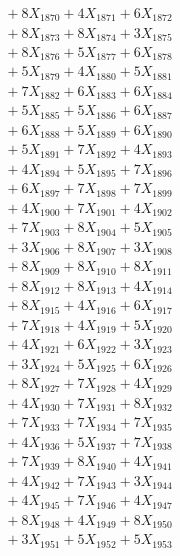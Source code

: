 \documentclass[a4paper,10pt]{article}
\begin{document}
{\begin{align}
&\;  + 8 X_{1870} + 4 X_{1871} + 6 X_{1872} \\[0.3ex]
&\;  + 8 X_{1873} + 8 X_{1874} + 3 X_{1875} \\[0.3ex]
&\;  + 8 X_{1876} + 5 X_{1877} + 6 X_{1878} \\[0.3ex]
&\;  + 5 X_{1879} + 4 X_{1880} + 5 X_{1881} \\[0.3ex]
&\;  + 7 X_{1882} + 6 X_{1883} + 6 X_{1884} \\[0.3ex]
&\;  + 5 X_{1885} + 5 X_{1886} + 6 X_{1887} \\[0.3ex]
&\;  + 6 X_{1888} + 5 X_{1889} + 6 X_{1890} \\[0.3ex]
&\;  + 5 X_{1891} + 7 X_{1892} + 4 X_{1893} \\[0.3ex]
&\;  + 4 X_{1894} + 5 X_{1895} + 7 X_{1896} \\[0.3ex]
&\;  + 6 X_{1897} + 7 X_{1898} + 7 X_{1899} \\[0.5ex]\allowbreak
&\;  + 4 X_{1900} + 7 X_{1901} + 4 X_{1902} \\[0.3ex]
&\;  + 7 X_{1903} + 8 X_{1904} + 5 X_{1905} \\[0.3ex]
&\;  + 3 X_{1906} + 8 X_{1907} + 3 X_{1908} \\[0.3ex]
&\;  + 8 X_{1909} + 8 X_{1910} + 8 X_{1911} \\[0.3ex]
&\;  + 8 X_{1912} + 8 X_{1913} + 4 X_{1914} \\[0.3ex]
&\;  + 8 X_{1915} + 4 X_{1916} + 6 X_{1917} \\[0.3ex]
&\;  + 7 X_{1918} + 4 X_{1919} + 5 X_{1920} \\[0.3ex]
&\;  + 4 X_{1921} + 6 X_{1922} + 3 X_{1923} \\[0.3ex]
&\;  + 3 X_{1924} + 5 X_{1925} + 6 X_{1926} \\[0.3ex]
&\;  + 8 X_{1927} + 7 X_{1928} + 4 X_{1929} \\[0.5ex]\allowbreak
&\;  + 4 X_{1930} + 7 X_{1931} + 8 X_{1932} \\[0.3ex]
&\;  + 7 X_{1933} + 7 X_{1934} + 7 X_{1935} \\[0.3ex]
&\;  + 4 X_{1936} + 5 X_{1937} + 7 X_{1938} \\[0.3ex]
&\;  + 7 X_{1939} + 8 X_{1940} + 4 X_{1941} \\[0.3ex]
&\;  + 4 X_{1942} + 7 X_{1943} + 3 X_{1944} \\[0.3ex]
&\;  + 4 X_{1945} + 7 X_{1946} + 4 X_{1947} \\[0.3ex]
&\;  + 8 X_{1948} + 4 X_{1949} + 8 X_{1950} \\[0.3ex]
&\;  + 3 X_{1951} + 5 X_{1952} + 5 X_{1953} \\[0.3ex]

\end{align}}
\end{document}
